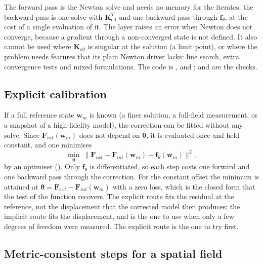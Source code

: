 The forward pass is the Newton solve and needs no memory for the iterates; the backward pass is one solve with $\bm K_{\mathrm{eff}}^T$ and one backward pass through $\bm f_\theta$, at the cost of a single evaluation of it. The layer raises an error when Newton does not converge, because a gradient through a non-converged state is not defined. It also cannot be used where $\bm K_{\mathrm{eff}}$ is singular at the solution (a limit point), or where the problem needs features that its plain Newton driver lacks: line search, extra convergence tests and mixed formulations. The code is ,  and ;  and  are the checks.

\subsection{Explicit calibration}\label{sec:df-explicit}

If a full reference state $\bm w_m$ is known (a finer solution, a full-field measurement, or a snapshot of a high-fidelity model), the correction can be fitted without any solve. Since $\bm F_{int}(\bm w_m)$ does not depend on $\bm\theta$, it is evaluated once and held constant, and one minimises
\begin{equation}\label{eq:df-explicit}
\min_{\bm\theta}\ \big\|\bm F_{ext}-\bm F_{int}(\bm w_m)-\bm f_\theta(\bm w_m)\big\|^2 ,
\end{equation}
by an optimiser (). Only $\bm f_\theta$ is differentiated, so each step costs one forward and one backward pass through the correction. For the constant offset the minimum is attained at $\bm\theta=\bm F_{ext}-\bm F_{int}(\bm w_m)$ with a zero loss, which is the closed form that the test of the function recovers. The explicit route fits the residual at the reference, not the displacement that the corrected model then produces; the implicit route fits the displacement, and is the one to use when only a few degrees of freedom were measured. The explicit route is the one to try first.

\subsection{Metric-consistent steps for a spatial field}\label{sec:df-metric}

